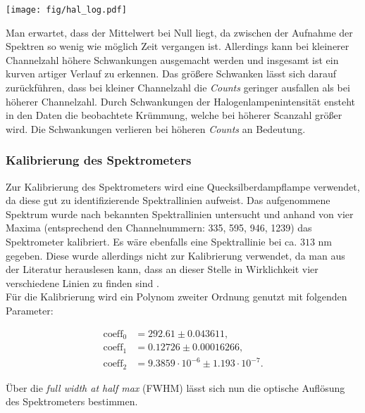 \documentclass[12pt, a4paper, bibliography=totoc]{scrartcl}
\begin{document}
\begin{multicols}{2}
\begin{center}
    \texttt{[image: fig/hal\_log.pdf]}
    \label{fig:hal_log}
\end{center}


Man erwartet, dass der Mittelwert bei Null liegt, da zwischen der Aufnahme der Spektren so wenig wie möglich Zeit vergangen ist. Allerdings kann bei kleinerer Channelzahl höhere Schwankungen ausgemacht werden und insgesamt ist ein kurven artiger Verlauf zu erkennen.
Das größere Schwanken lässt sich darauf zurückführen, dass bei kleiner Channelzahl die \textit{Counts} geringer ausfallen als bei höherer Channelzahl.
Durch Schwankungen der Halogenlampenintensität ensteht in den Daten die beobachtete Krümmung, welche bei höherer Scanzahl größer wird. Die Schwankungen verlieren bei höheren \textit{Counts} an Bedeutung.

\subsubsection{Kalibrierung des Spektrometers}\label{sssec:calibrating_the_spectrometer}

Zur Kalibrierung des Spektrometers wird eine Quecksilberdampflampe verwendet, da diese gut zu identifizierende Spektrallinien aufweist.
Das aufgenommene Spektrum wurde nach bekannten Spektrallinien untersucht und anhand von vier Maxima (entsprechend den Channelnummern: 335, 595, 946, 1239) das Spektrometer kalibriert. 
Es wäre ebenfalls eine Spektrallinie bei ca. $313$ \si{nm} gegeben. 
Diese wurde allerdings nicht zur Kalibrierung verwendet, da man aus der Literatur herauslesen kann, dass an dieser Stelle in Wirklichkeit vier verschiedene Linien zu finden sind \cite{doas08}.\\
Für die Kalibrierung wird ein Polynom zweiter Ordnung genutzt mit folgenden Parameter: 

\begin{align}
    \text{coeff}_0 &= 292.61 \pm 0.043611, \\
    \text{coeff}_1 &= 0.12726 \pm 0.00016266, \\
    \text{coeff}_2 &= 9.3859 \cdot 10^{-6} \pm 1.193 \cdot 10^{-7}. 
\end{align}
 
Über die \textit{full width at half max} (FWHM) lässt sich nun die optische Auflösung des Spektrometers bestimmen.

\begin{center}
	

\end{center}
\end{multicols}
\end{document}
